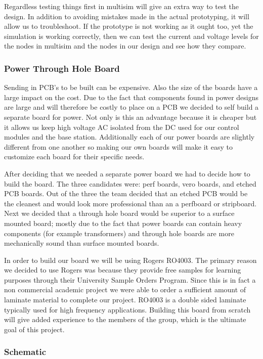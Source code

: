 Regardless testing things first in multisim will give an extra way to test the
design. In addition to avoiding mistakes made in the actual prototyping, it
will allow us to troubleshoot. If the prototype is not working as it ought too,
yet the simulation is working correctly, then we can test the current and
voltage levels for the nodes in multisim and the nodes in our design and see
how they compare.

\subsubsection{Power Through Hole Board}
\label{sec:power-through}
Sending in PCB{}'s to be built can be expensive. Also the size of the boards
have a large impact on the cost. Due to the fact that components found in power
designs are large and will therefore be costly to place on a PCB we decided to
self build a separate board for power. Not only is this an advantage because it
is cheaper but it allows us keep high voltage AC isolated from the DC used for
our control modules and the base station. Additionally each of our power boards
are slightly different from one another so making our own boards will make it
easy to customize each board for their specific needs.

After deciding that we needed a separate power board we had to decide how to
build the board. The three candidates were: perf boards, vero boards, and
etched PCB boards. Out of the three the team decided that an etched PCB would
be the cleanest and would look more professional than an a perfboard or
stripboard. Next we decided that a through hole board would be superior to a
surface mounted board; mostly due to the fact that power boards can contain
heavy components (for example transformers) and through hole boards are more
mechanically sound than surface mounted boards.

In order to build our board we will be using Rogers RO4003. The primary reason
we decided to use Rogers was because they provide free samples for learning
purposes through their University Sample Orders Program. Since this is in fact
a non commercial academic project we were able to order a sufficient amount of
laminate material to complete our project.  RO4003 is a double sided laminate
typically used for high frequency applications. Building this board from
scratch will give added experience to the members of the group, which is the
ultimate goal of this project.

\subsubsection{Schematic}

